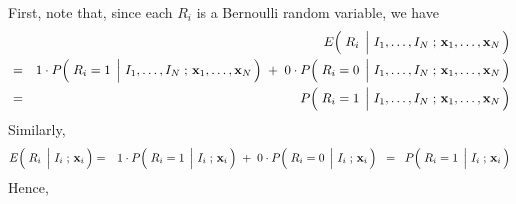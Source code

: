 \proof
First, note that, since each $R_{i}$ is a Bernoulli random variable, we have
\begin{eqnarray*}
&&
	E\!\left(\,
	\left.\overset{{\color{white}.}}{R_{i}}\;\,\right\vert\,
	I_{1},\ldots,I_{N}\;;\,\mathbf{x}_{1},\ldots,\mathbf{x}_{N}
	\,\right)
\\
& = &
	1 \cdot P\!\left(\,
		\left.\overset{{\color{white}.}}{R_{i}}=1\;\,\right\vert\,
		I_{1},\ldots,I_{N}\;;\,\mathbf{x}_{1},\ldots,\mathbf{x}_{N}
		\,\right)
	\; + \;
	0 \cdot P\!\left(\,
		\left.\overset{{\color{white}.}}{R_{i}}=0\;\,\right\vert\,
		I_{1},\ldots,I_{N}\;;\,\mathbf{x}_{1},\ldots,\mathbf{x}_{N}
		\,\right)
\\
& = &
	P\!\left(\,
		\left.\overset{{\color{white}.}}{R_{i}}=1\;\,\right\vert\,
		I_{1},\ldots,I_{N}\;;\,\mathbf{x}_{1},\ldots,\mathbf{x}_{N}
		\,\right)
\end{eqnarray*}
Similarly,
\begin{eqnarray*}
E\!\left(\,\left.\overset{{\color{white}.}}{R_{i}}\;\,\right\vert\,I_{i}\;;\,\mathbf{x}_{i}\,\right)
& = &
	1 \cdot P\!\left(\,\left.\overset{{\color{white}.}}{R_{i}}=1\;\,\right\vert\,I_{i}\;;\,\mathbf{x}_{i}\,\right)
	\; + \;
	0 \cdot P\!\left(\,\left.\overset{{\color{white}.}}{R_{i}}=0\;\,\right\vert\,I_{i}\;;\,\mathbf{x}_{i}\,\right)
\;\; = \;\;
	P\!\left(\,\left.\overset{{\color{white}.}}{R_{i}}=1\;\,\right\vert\,I_{i}\;;\,\mathbf{x}_{i}\,\right)
\end{eqnarray*}
Hence,
